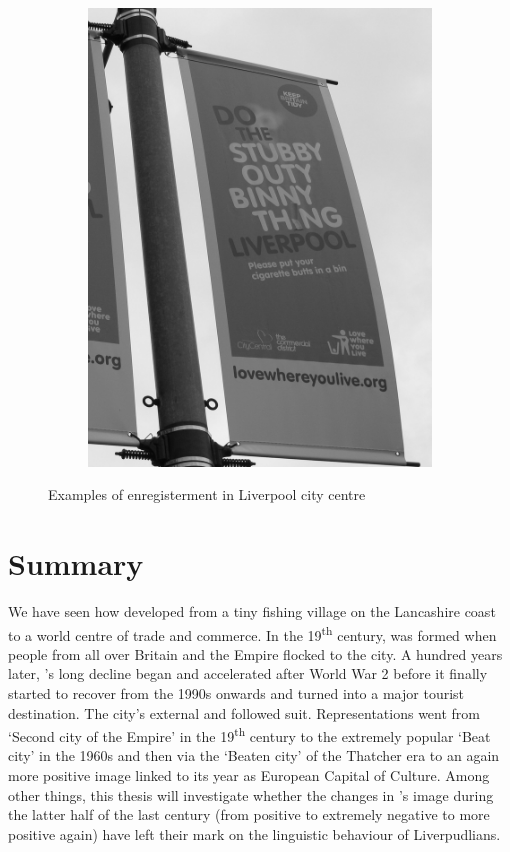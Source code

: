 \begin{figure}[h]
\begin{subfigure}[h]{0.45\textwidth}
				\includegraphics[width=\textwidth]{figures/stubby}
			\end{subfigure}
		\caption{Examples of enregisterment in Liverpool city centre}
		\label{fig.posters}
	\end{figure}

\section{Summary}\label{sec.hist.con}

We have seen how  developed from a tiny fishing village on the Lancashire coast to a world centre of trade and commerce.
In the 19\textsuperscript{th} century,  was formed when people from all over Britain and the Empire flocked to the city.
A hundred years later, 's long decline began and accelerated after World War 2 before it finally started to recover from the 1990s onwards and turned into a major tourist destination.
The city's external and  followed suit.
Representations went from `Second city of the Empire' in the 19\textsuperscript{th} century to the extremely popular `Beat city' in the 1960s and then via the `Beaten city' of the Thatcher era to an again more positive image linked to its year as European Capital of Culture.
Among other things, this thesis will investigate whether the changes in 's image during the latter half of the last century (from positive to extremely negative to more positive again) have left their mark on the linguistic behaviour of Liverpudlians.